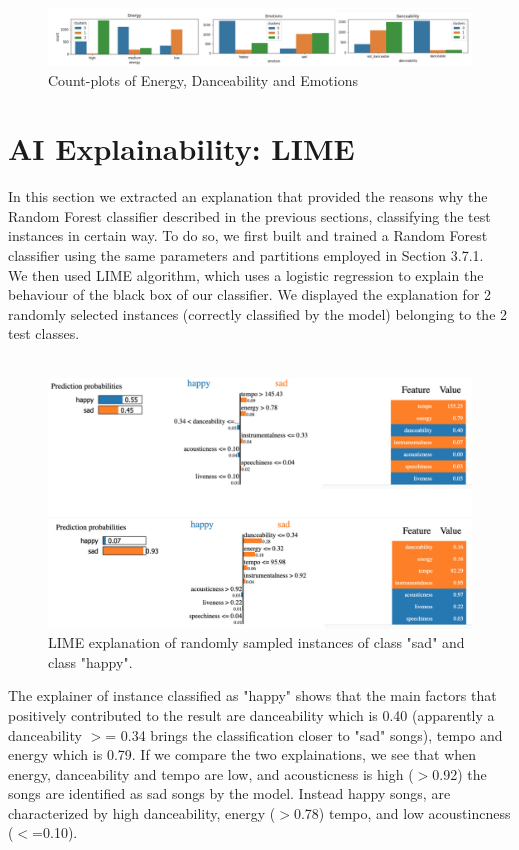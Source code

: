 \begin{figure}[!htb]
  \centering
  \includegraphics[width=1\linewidth]{images/transactional_clustering.png}
  \caption{Count-plots of Energy, Danceability and Emotions}
\end{figure}

\section{AI Explainability: LIME}
In this section we extracted an explanation that provided the reasons why the Random Forest classifier described in the previous sections, classifying the test instances in certain way.
To do so, we first built and trained a Random Forest classifier using the same parameters and partitions employed in Section 3.7.1.\\ We then used LIME algorithm, which uses a logistic regression to explain the behaviour of the black box of our classifier. 
We displayed the explanation for 2 randomly selected instances (correctly classified by the model) belonging to the 2 test classes. 
\\
\\

\begin{figure}[htb!]
  \centering
  \includegraphics[width=1\linewidth]{images/LIME.png}
  \caption{LIME explanation of randomly sampled instances of class "sad" and class "happy".}
\end{figure}

The explainer of instance classified as "happy" shows that the main factors that positively contributed to the result are danceability which is 0.40 (apparently a danceability $>$= 0.34 brings the classification closer to "sad" songs), tempo and energy which is 0.79.
If we compare the two explainations, we see that when energy, danceability and tempo are low, and acousticness is high ($>$0.92) the songs are identified as sad songs by the model. Instead happy songs, are characterized by high danceability, energy ($>$0.78) tempo, and low acoustincness ($<$=0.10).
\newpage